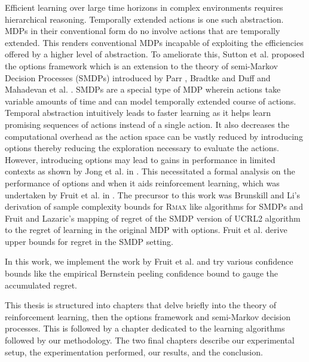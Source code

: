 Efficient learning over large time horizons in complex environments requires hierarchical reasoning.
Temporally extended actions is one such abstraction.
MDPs in their conventional form do no involve actions that are temporally extended.
This renders conventional MDPs incapable of exploiting the efficiencies offered by a higher level of abstraction.
To ameliorate this, Sutton et al. proposed the options framework \cite{sutton_between_1999} which is an extension to the theory of semi-Markov Decision Processes (SMDPs) introduced by Parr \cite{parr_reinforcement_nodate}, Bradtke and Duff \cite{bradtke_reinforcement_1995} and Mahadevan et al. \cite{mahadevan_self-improving_1997}.
SMDPs are a special type of MDP wherein actions take variable amounts of time and can model temporally extended course of actions.
Temporal abstraction intuitively leads to faster learning as it helps learn promising sequences of actions instead of a single action.
It also decreases the computational overhead as the action space can be vastly reduced by introducing options thereby reducing the exploration necessary to evaluate the actions.
However, introducing options may lead to gains in performance in limited contexts as shown by Jong et al. in \cite{jong_utility_2008}.
This necessitated a formal analysis on the performance of options and when it aids reinforcement learning, which was undertaken by Fruit et al. in \cite{fruit_exploration--exploitation_2017}. 
The precursor to this work was Brunskill and Li's \cite{brunskill_pac-inspired_2014} derivation of sample complexity bounds for R\textsc{max} like algorithms for SMDPs and Fruit and Lazaric's \cite{fruit_exploration--exploitation_2017} mapping of regret of the SMDP version of UCRL2 algorithm to the regret of learning in the original MDP with options.
Fruit et al. \cite{fruit_exploration--exploitation_2017} derive upper bounds for regret in the SMDP setting.

In this work, we implement the work by Fruit et al.\cite{fruit_exploration--exploitation_2017} and try various confidence bounds like the empirical Bernstein peeling confidence bound to gauge the accumulated regret.

This thesis is structured into chapters that delve briefly into the theory of reinforcement learning, then the options framework and semi-Markov decision processes.
This is followed by a chapter dedicated to the learning algorithms followed by our methodology.
The two final chapters describe our experimental setup, the experimentation performed, our results, and the conclusion.


\newpage
